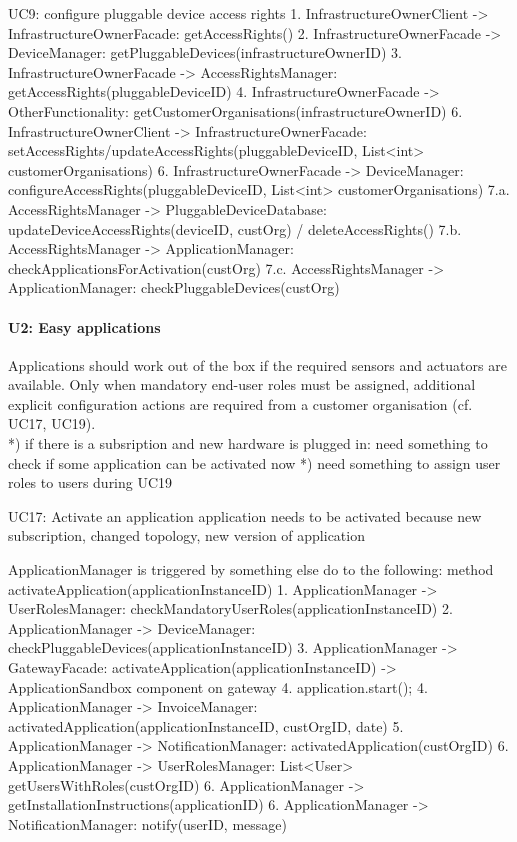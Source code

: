         UC9: configure pluggable device access rights
            1. InfrastructureOwnerClient -> InfrastructureOwnerFacade: getAccessRights()
                2. InfrastructureOwnerFacade -> DeviceManager: getPluggableDevices(infrastructureOwnerID)
                3. InfrastructureOwnerFacade -> AccessRightsManager: getAccessRights(pluggableDeviceID)
                4. InfrastructureOwnerFacade -> OtherFunctionality: getCustomerOrganisations(infrastructureOwnerID)
            6. InfrastructureOwnerClient -> InfrastructureOwnerFacade: setAccessRights/updateAccessRights(pluggableDeviceID, List<int> customerOrganisations)
                6. InfrastructureOwnerFacade -> DeviceManager: configureAccessRights(pluggableDeviceID, List<int> customerOrganisations)
                7.a. AccessRightsManager -> PluggableDeviceDatabase: updateDeviceAccessRights(deviceID, custOrg) / deleteAccessRights()
                7.b. AccessRightsManager -> ApplicationManager: checkApplicationsForActivation(custOrg)
                7.c. AccessRightsManager -> ApplicationManager: checkPluggableDevices(custOrg)


    \paragraph{U2: Easy applications}
        Applications should work out of the box if the required sensors and
        actuators are available. Only when mandatory end-user roles must be
        assigned, additional explicit configuration actions are required
        from a customer organisation (cf. UC17, UC19). \\
        *) if there is a subsription and new hardware is plugged in: need something to check
           if some application can be activated now
        *) need something to assign user roles to users during UC19

        UC17: Activate an application
            application needs to be activated because new subscription, changed topology, new version of application

            ApplicationManager is triggered by something else do to the following: method activateApplication(applicationInstanceID)
            1. ApplicationManager -> UserRolesManager: checkMandatoryUserRoles(applicationInstanceID)
            2. ApplicationManager -> DeviceManager: checkPluggableDevices(applicationInstanceID)
            3. ApplicationManager -> GatewayFacade: activateApplication(applicationInstanceID) -> ApplicationSandbox component on gateway
            4. application.start();
            4. ApplicationManager -> InvoiceManager: activatedApplication(applicationInstanceID, custOrgID, date)
            5. ApplicationManager -> NotificationManager: activatedApplication(custOrgID)
            6. ApplicationManager -> UserRolesManager: List<User> getUsersWithRoles(custOrgID)
            6. ApplicationManager -> getInstallationInstructions(applicationID)
            6. ApplicationManager -> NotificationManager: notify(userID, message)

